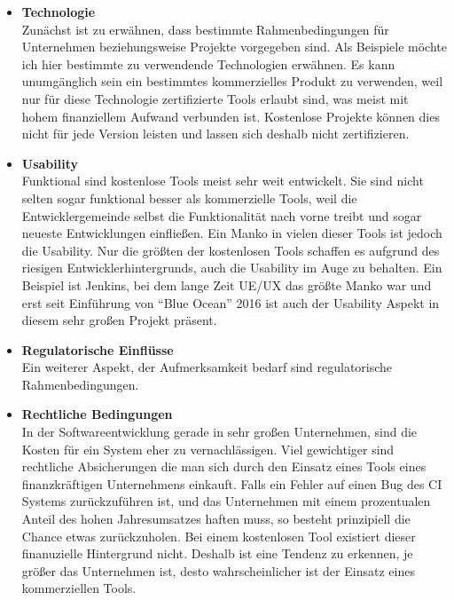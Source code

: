 \begin{itemize}
	\item \textbf{Technologie}\\
	Zunächst ist zu erwähnen, dass bestimmte Rahmenbedingungen für Unternehmen beziehungsweise Projekte vorgegeben sind. Als Beispiele möchte ich hier bestimmte zu verwendende Technologien erwähnen. Es kann unumgänglich sein ein bestimmtes kommerzielles Produkt zu verwenden, weil nur für diese Technologie zertifizierte Tools erlaubt sind, was meist mit hohem finanziellem Aufwand verbunden ist. Kostenlose Projekte können dies nicht für jede Version leisten und lassen sich deshalb nicht zertifizieren.
	\item \textbf{Usability}\\
	Funktional sind kostenlose Tools meist sehr weit entwickelt. Sie sind nicht selten sogar funktional besser als kommerzielle Tools, weil die Entwicklergemeinde selbst die Funktionalität nach vorne treibt und sogar neueste Entwicklungen einfließen. Ein Manko in vielen dieser Tools ist jedoch die Usability. Nur die größten der kostenlosen Tools schaffen es aufgrund des riesigen Entwicklerhintergrunds, auch die Usability im Auge zu behalten. Ein Beispiel ist Jenkins, bei dem lange Zeit UE/UX das größte Manko war und erst seit Einführung von "`Blue Ocean"' 2016 ist auch der Usability Aspekt in diesem sehr großen Projekt präsent.
	\item \textbf{Regulatorische Einflüsse}\\
	Ein weiterer Aspekt, der Aufmerksamkeit bedarf sind regulatorische Rahmenbedingungen. 
	\item \textbf{Rechtliche Bedingungen}\\
	In der Softwareentwicklung gerade in sehr großen Unternehmen, sind die Kosten für ein System eher zu vernachlässigen. Viel gewichtiger sind rechtliche Absicherungen die man sich durch den Einsatz eines Tools eines finanzkräftigen Unternehmens einkauft. Falls ein Fehler auf einen Bug des CI Systems zurückzuführen ist, und das Unternehmen mit einem prozentualen Anteil des hohen Jahresumsatzes haften muss, so besteht prinzipiell die Chance etwas zurückzuholen. Bei einem kostenlosen Tool existiert dieser finanuzielle Hintergrund nicht. Deshalb ist eine Tendenz zu erkennen, je größer das Unternehmen ist, desto wahrscheinlicher ist der Einsatz eines kommerziellen Tools.
	\end{itemize}
